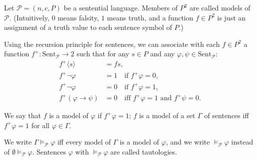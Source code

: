 Let $\mathcal{P} = (n, c, P)$ be a sentential language. Members of $P^2$ are called models of $\mathcal{P}$. (Intuitively, $0$ means falsity, $1$ means truth, and a function $f \in P^2$ is just an assignment of a truth value to each sentence symbol of $P$.)

Using the recursion principle for sentences, we can associate with each $f \in P^2$ a function $f^+: \text{Sent}_{\mathcal{P}} \to 2$ such that for any $s \in P$ and any $\varphi, \psi \in \text{Sent}_{\mathcal{P}}$:
\begin{align*}
f^+ \langle s \rangle &= f s,\\[4pt]
f^+ \neg \varphi &= 1 \quad \text{if } f^+ \varphi = 0,\\
f^+ \neg \varphi &= 0 \quad \text{if } f^+ \varphi = 1,\\[4pt]
f^+ (\varphi \to \psi) &= 0 \quad \text{iff } f^+ \varphi = 1 \text{ and } f^+ \psi = 0.
\end{align*}

We say that $f$ is a model of $\varphi$ if $f^+ \varphi = 1$; $f$ is a model of a set $\Gamma$ of sentences iff $f^+ \varphi = 1$ for all $\varphi \in \Gamma$.

We write $\Gamma \models_{\mathcal{P}} \varphi$ iff every model of $\Gamma$ is a model of $\varphi$, and we write $\models_{\mathcal{P}} \varphi$ instead of $\emptyset \models_{\mathcal{P}} \varphi$. Sentences $\varphi$ with $\models_{\mathcal{P}} \varphi$ are called tautologies.
